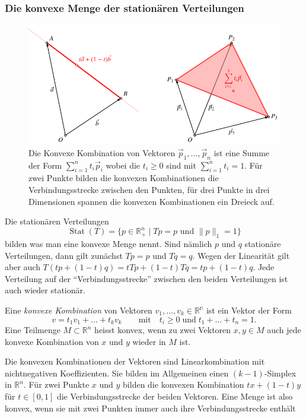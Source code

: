 \subsubsection{Die konvexe Menge der stationären Verteilungen}
\begin{figure}
\centering
\includegraphics{chapters/80-wahrscheinlichkeit/images/konvex.pdf}
\caption{Die Konvexe Kombination von Vektoren $\vec{p}_1,\dots,\vec{p}_n$ ist
eine Summe der Form $\sum_{i=1}^n t_i\vec{p}_i$ wobei die $t_i\ge 0$
sind mit $\sum_{i=1}^nt_i=1$.
Für zwei Punkte bilden die konvexen Kombinationen die Verbindungsstrecke
zwischen den Punkten, für drei Punkte in drei Dimensionen spannen die
konvexen Kombinationen ein Dreieck auf.
\label{buch:wahrscheinlichkeit:fig:konvex}}
\end{figure}
Die stationären Verteilungen
\[
\operatorname{Stat}(T)
=
\{
p\in\mathbb R_+^n\;|\; \text{$Tp=p $ und $\|p\|_1=1$}
\}
\]
bilden was man eine konvexe Menge nennt.
Sind nämlich $p$ und $q$ stationäre Verteilungen, dann gilt zunächst
$Tp=p$ und $Tq=q$.
Wegen der Linearität gilt aber auch $T(tp+(1-t)q)=tTp + (1-t)Tq
=tp+(1-t)q$.
Jede Verteilung auf der ``Verbindungsstrecke'' zwischen den beiden
Verteilungen ist auch wieder stationär.

\begin{definition}
Eine {\em konvexe Kombination} von Vektoren $v_1,\dots,v_k\in\mathbb{R^n}$
ist ein Vektor der Form
\[
v=t_1v_1+\dots + t_kv_k
\qquad\text{mit}\quad
t_i\ge 0\;\text{und}\;
t_1+\dots+t_n = 1.
\]
%
Eine Teilmenge $M\subset \mathbb{R}^n$ heisst konvex, wenn zu
zwei Vektoren $x,y\in M$ auch jede konvexe Kombination von $x$ und $y$
wieder in $M$ ist.
%
\end{definition}

Die konvexen Kombinationen der Vektoren sind Linearkombination
mit nichtnegativen Koeffizienten. Sie bilden im Allgemeinen
einen $(k-1)$-Simplex in $\mathbb{R}^n$.
Für zwei Punkte $x$ und $y$ bilden die konvexen Kombination
$tx+(1-t)y$ für $t\in[0,1]$ die Verbindungsstrecke der beiden
Vektoren.
Eine Menge ist also konvex, wenn sie mit zwei Punkten immer auch
ihre Verbindungsstrecke enthält



